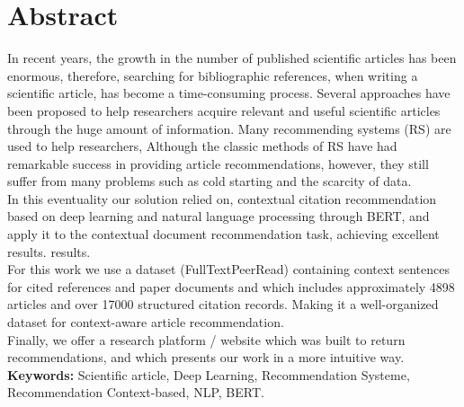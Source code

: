 \documentclass[11pt,a4paper]{report}
\begin{document}
    \section*{Abstract}
    \par In recent years, the growth in the number of published scientific articles has been enormous, therefore, searching for bibliographic references, when writing a scientific article, has become a time-consuming process. Several approaches have been proposed to help researchers acquire relevant and useful scientific articles through the huge amount of information. Many recommending systems (RS) are used to help researchers, Although the classic methods of RS have had remarkable success in providing article recommendations, however, they still suffer from many problems such as cold starting and the scarcity of data.\\
    In this eventuality our solution relied on, contextual citation recommendation based on deep learning and natural language processing through BERT, and apply it to the contextual document recommendation task, achieving excellent results. results.\\
    For this work we use a dataset (FullTextPeerRead) containing context sentences for cited references and paper documents and which includes approximately 4898 articles and over 17000 structured citation records. Making it a well-organized dataset for context-aware article recommendation.\\
    Finally, we offer a research platform / website which was built to return recommendations, and which presents our work in a more intuitive way.\\
    
    \textbf{Keywords:}  Scientific article, Deep Learning, Recommendation Systeme, Recommendation Context-based, NLP, BERT.
    
    \hbox{\raisebox{0em}{\vrule depth 0pt height 1pt width \textwidth}}
    
    
        
\end{document}
